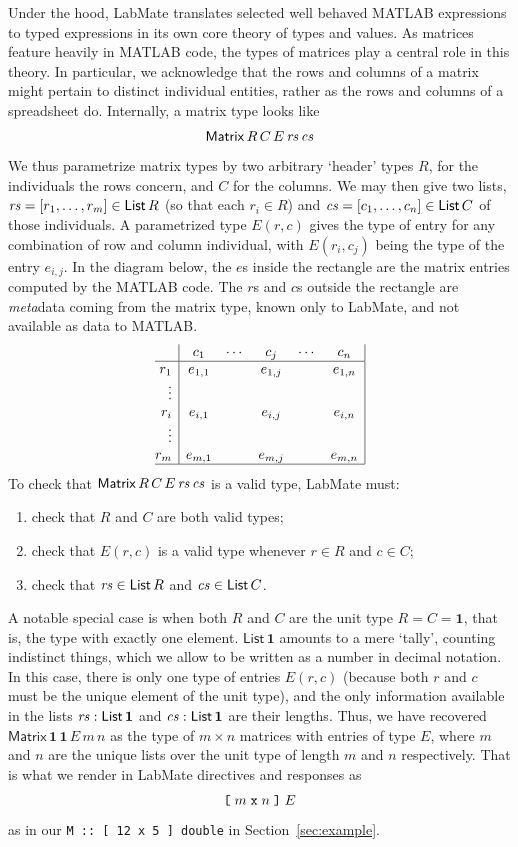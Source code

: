 \documentclass{IMEKO2024}
\newcommand{\lsb}{\texttt{\symbol{91}}}
\newcommand{\rsb}{\texttt{\symbol{93}}}
\newcommand{\One}{\mathbf{1}}
\newcommand{\Matrix}[5]{\mathsf{Matrix}\,#1\,#2\,#3\,#4\,#5}
\newcommand{\List}[1]{\mathsf{List}\,#1}
\newcommand{\remph}{\emph}
\newcommand{\param}{parametrize}
\begin{document}
Under the hood, LabMate translates selected well behaved MATLAB expressions
to typed expressions in its own core theory of types and values.
%
As matrices feature heavily in MATLAB code, the types of matrices
play a central role in this theory.
%
In particular, we acknowledge that the rows and columns of a matrix might pertain to distinct individual entities, rather as the rows and columns of a spreadsheet do.
%
Internally, a matrix type looks like
\[\Matrix{R}{C}{E}{\rs}{\cs}
\]
%
We thus \param{} matrix types by two arbitrary `header' types $R$, for the individuals the rows concern, and $C$ for the columns. We may then give two lists, $\rs = [r_1,\ldots,r_m]\in\List{R}$ (so that each $r_i\in R$) and $\cs = [c_1,\ldots,c_n]\in\List{C}$ of those individuals. A \param{}d type $E(r,c)$ gives the type of entry for any combination of row and column individual, with $E(r_i,c_j)$ being the type of the entry $e_{i,j}$. In the diagram below, the $e$s inside the rectangle are the matrix entries computed by the MATLAB code. The $r$s and $c$s outside the rectangle are \remph{meta}data coming from the matrix type, known only to LabMate, and not available as data to MATLAB.
\[\begin{array}{@{}r|ccccc|}
\; & c_1      & \cdots & c_j     & \cdots & c_n     \\
\hline
r_1    & e_{1,1}  &        & e_{1,j} &        & e_{1,n} \\
\vdots &          &        &         &        &         \\
r_i    & e_{i,1}  &        & e_{i,j} &        & e_{i,n} \\
\vdots &          &        &         &        &         \\
r_m    & e_{m,1}  &        & e_{m,j} &        & e_{m,n}  \\
\hline
\end{array}\]
To check that $\Matrix{R}{C}{E}{\rs}{\cs}$ is a valid type, LabMate must:
\begin{enumerate}
\item check that $R$ and $C$ are both valid types;
\item check that $E(r,c)$ is a valid type whenever $r\in R$ and $c\in C$;
\item check that $\rs\in\List{R}$ and $\cs\in\List{C}$.
\end{enumerate}

A notable special case is when both $R$ and $C$ are the unit type $R = C = \One$, that is, the type with exactly one element.
%
$\List{\One}$ amounts to a mere `tally', counting indistinct things, which we allow to be written as a number in decimal notation.
%
In this case, there is only one type of entries $E(r,c)$ (because both $r$
and $c$ must be the unique element of the unit type), and the only
information available in the lists $\rs : \List{\One}$ and
$\cs : \List{\One}$ are their lengths.
%
Thus, we have recovered $\Matrix{\One}{\One}{E}{m}{n}$ as the type of
$m \times n$ matrices with entries of type $E$, where $m$ and $n$ are
the unique lists over the unit type of length $m$ and $n$
respectively.
%
That is what we render in LabMate directives and responses as
\[
\lsb \;m \;\texttt{x}\; n\; \rsb\; E
\]
as in our \texttt{M :: [ 12 x 5 ] double} in Section~\ref{sec:example}.
\end{document}
